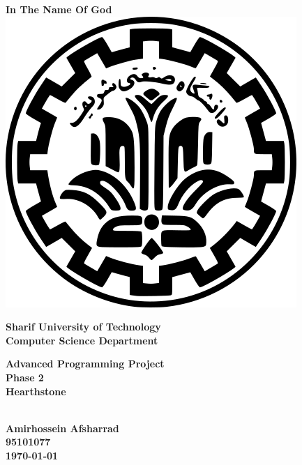 \documentclass[a4paper]{article}
\begin{document}
	
\begin{titlepage}
	
	\begin{center}
		\textbf{
			In The Name Of God\\
		}
		\vspace{2cm}
		\includegraphics[scale=0.25]{logo.png}\\
		\vspace{0.5cm}
		\begin{Large}
			\textbf{
				Sharif University of Technology\\
				\vspace{0.5cm}
				Computer Science Department\\
			}
		\end{Large}
		\vspace{2.5cm}
		\begin{huge}
			\textbf{
				Advanced Programming Project\\
				 Phase 2\\
				\vspace{1cm}
				Hearthstone\\
			}
		\end{huge}
		\vspace{1.5cm}
		\begin{Large}
			\textbf{
				\\
				\vspace{1cm}
				Amirhossein Afsharrad\\
				\vspace{0.5cm}
				95101077\\
				\vspace{2cm}
				\today
			}
		\end{Large}
		
	\end{center}
	
	\thispagestyle{empty}
\end{titlepage}	
\end{document}
